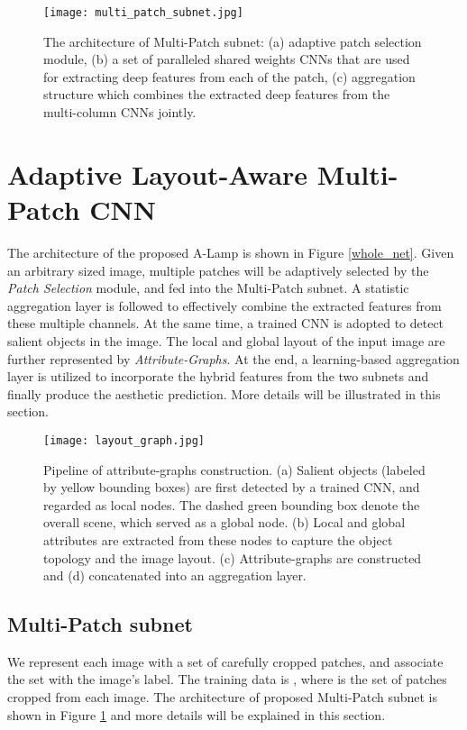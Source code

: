\documentclass[10pt,twocolumn,letterpaper]{article}
\begin{document}
\begin{figure}
		\centering
		\texttt{[image: multi\_patch\_subnet.jpg]}
		\caption{The architecture of Multi-Patch subnet: (a) adaptive patch selection module, (b) a set of paralleled shared weights CNNs that are used for extracting deep features from each of the patch, (c) aggregation structure which combines the extracted deep features from the multi-column CNNs jointly.}
		\label{multi_patch}
		\vspace{-3mm}
	\end{figure} 
\section{Adaptive Layout-Aware Multi-Patch CNN}
	The architecture of the proposed A-Lamp is shown in Figure \ref{whole_net}. Given an arbitrary sized image, multiple patches will be adaptively selected by the \textit{Patch Selection} module, and fed into the Multi-Patch subnet. A statistic aggregation layer is followed to effectively combine the extracted features from these multiple channels.
	At the same time, a trained CNN is adopted to detect salient objects in the image. The local and global layout of the input image are further represented by \textit{Attribute-Graphs}. At the end, a learning-based aggregation layer is utilized to incorporate the hybrid features from the two subnets and finally produce the aesthetic prediction. More details will be illustrated in this section. 
	\begin{figure*}
		\centering
		\texttt{[image: layout\_graph.jpg]}
		\caption{Pipeline of attribute-graphs construction. (a) Salient objects (labeled by yellow bounding boxes) are first detected by a trained CNN, and regarded as local nodes. The dashed green bounding box denote the overall scene, which served as a global node. (b) Local and global attributes are extracted from these nodes to capture the object topology and the image layout. (c) Attribute-graphs are constructed and (d) concatenated into an aggregation layer.}
		\label{layout}
		\vspace{-3mm}
	\end{figure*}
	
	\subsection{Multi-Patch subnet}
	We represent each image with a set of carefully cropped patches, and associate the set with the image's label.
	The training data is , where  is the set of  patches cropped from each image. The architecture of proposed Multi-Patch subnet is shown in Figure \ref{multi_patch} and more details will be explained in this section. 
	
\end{document}
